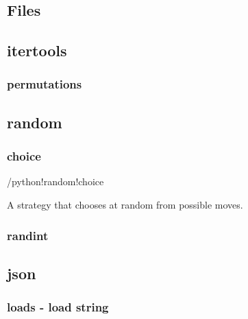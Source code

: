 \documentclass[12pt]{article}
\begin{document}




\subsection{Files}




\subsection{itertools}

\subsubsection{permutations}





\subsection{random}


\subsubsection{choice}\index/{python!random!choice}



A strategy that chooses at random from possible moves.




\subsubsection{randint}





\subsection{json}

\subsubsection{loads - load string}


\end{document}

